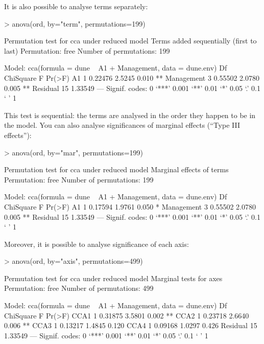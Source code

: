 \documentclass[a4paper,10pt]{article}
\begin{document}
It is also possible to analyse terms separately:
\begin{Schunk}
\begin{Sinput}
> anova(ord, by="term", permutations=199)
\end{Sinput}
\begin{Soutput}
Permutation test for cca under reduced model
Terms added sequentially (first to last)
Permutation: free
Number of permutations: 199

Model: cca(formula = dune ~ A1 + Management, data = dune.env)
           Df ChiSquare      F Pr(>F)   
A1          1   0.22476 2.5245  0.010 **
Management  3   0.55502 2.0780  0.005 **
Residual   15   1.33549                 
---
Signif. codes:  0 ‘***’ 0.001 ‘**’ 0.01 ‘*’ 0.05 ‘.’ 0.1 ‘ ’ 1
\end{Soutput}
\end{Schunk}
This test is sequential: the terms are analysed
in the order they happen to be in the model. You can also analyse
significances of marginal effects (``Type III effects''):
\begin{Schunk}
\begin{Sinput}
> anova(ord, by="mar", permutations=199)
\end{Sinput}
\begin{Soutput}
Permutation test for cca under reduced model
Marginal effects of terms
Permutation: free
Number of permutations: 199

Model: cca(formula = dune ~ A1 + Management, data = dune.env)
           Df ChiSquare      F Pr(>F)   
A1          1   0.17594 1.9761  0.050 * 
Management  3   0.55502 2.0780  0.005 **
Residual   15   1.33549                 
---
Signif. codes:  0 ‘***’ 0.001 ‘**’ 0.01 ‘*’ 0.05 ‘.’ 0.1 ‘ ’ 1
\end{Soutput}
\end{Schunk}

Moreover, it is possible to analyse significance of each axis:
\begin{Schunk}
\begin{Sinput}
> anova(ord, by="axis", permutations=499)
\end{Sinput}
\begin{Soutput}
Permutation test for cca under reduced model
Marginal tests for axes
Permutation: free
Number of permutations: 499

Model: cca(formula = dune ~ A1 + Management, data = dune.env)
         Df ChiSquare      F Pr(>F)   
CCA1      1   0.31875 3.5801  0.002 **
CCA2      1   0.23718 2.6640  0.006 **
CCA3      1   0.13217 1.4845  0.120   
CCA4      1   0.09168 1.0297  0.426   
Residual 15   1.33549                 
---
Signif. codes:  0 ‘***’ 0.001 ‘**’ 0.01 ‘*’ 0.05 ‘.’ 0.1 ‘ ’ 1
\end{Soutput}
\end{Schunk}
\end{document}
